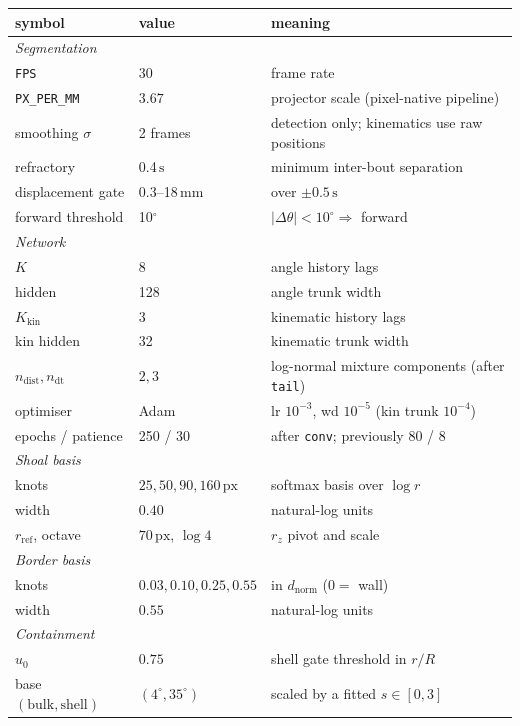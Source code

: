 \documentclass[11pt,a4paper]{article}
\newcommand{\uu}[1]{\ensuremath{\,\mathrm{#1}}}  %
\newcommand{\dg}{\ensuremath{^\circ}}             %
\newcommand{\dth}{\ensuremath{\Delta\theta}}
\newcommand{\code}[1]{\texttt{\small #1}}
\begin{document}
\begin{center}\small
\begin{tabular}{llp{}}
\toprule
\textbf{symbol} & \textbf{value} & \textbf{meaning} \\
\midrule
\multicolumn{3}{l}{\textit{Segmentation}}\\
\code{FPS} & $30$ & frame rate \\
\code{PX\_PER\_MM} & $3.67$ & projector scale (pixel-native pipeline) \\
smoothing $\sigma$ & 2 frames & detection only; kinematics use raw positions \\
refractory & 0.4\uu{s} & minimum inter-bout separation \\
displacement gate & $0.3$--18\uu{mm} & over $\pm0.5\uu{s}$ \\
forward threshold & 10\dg{} & $|\dth| < 10^\circ \Rightarrow$ forward \\
\midrule
\multicolumn{3}{l}{\textit{Network}}\\
$K$ & 8 & angle history lags \\
hidden & 128 & angle trunk width \\
$K_{\mathrm{kin}}$ & 3 & kinematic history lags \\
kin hidden & 32 & kinematic trunk width \\
$n_{\mathrm{dist}}, n_{\mathrm{dt}}$ & $2, 3$ & log-normal mixture components (after \code{tail}) \\
optimiser & Adam & lr $10^{-3}$, wd $10^{-5}$ (kin trunk $10^{-4}$) \\
epochs / patience & 250 / 30 & after \code{conv}; previously 80 / 8 \\
\midrule
\multicolumn{3}{l}{\textit{Shoal basis}}\\
knots & $25, 50, 90, 160\uu{px}$ & softmax basis over $\log r$ \\
width & $0.40$ & natural-log units \\
$r_{\mathrm{ref}}$, octave & $70\uu{px}$, $\log 4$ & $r_z$ pivot and scale \\
\midrule
\multicolumn{3}{l}{\textit{Border basis}}\\
knots & $0.03, 0.10, 0.25, 0.55$ & in $d_{\mathrm{norm}}$ ($0 =$ wall) \\
width & $0.55$ & natural-log units \\
\midrule
\multicolumn{3}{l}{\textit{Containment}}\\
$u_0$ & $0.75$ & shell gate threshold in $r/R$ \\
base $(\mathrm{bulk},\mathrm{shell})$ & $(4^\circ, 35^\circ)$ & scaled by a fitted $s \in [0,3]$ \\

\end{tabular}
\end{center}
\end{document}
